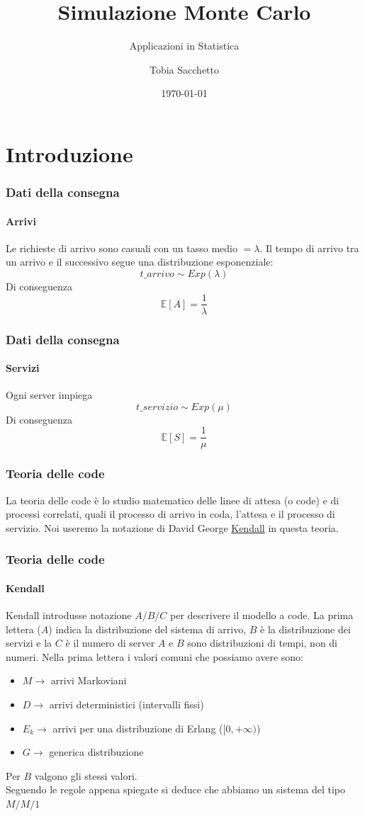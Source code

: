 \documentclass{beamer}
\title[Monte Carlo]{Simulazione Monte Carlo}
\subtitle{Applicazioni in Statistica}
\author{Tobia Sacchetto}
\institute{Università degli Studi di Ferrara}
\date{\today}
\begin{document}
\frame{\titlepage}

\section{Introduzione}

\begin{frame}
\frametitle{Dati della consegna}
\framesubtitle{Arrivi}
    Le richieste di arrivo sono casuali con un tasso medio $=\lambda$. Il tempo di arrivo tra un arrivo e il successivo segue una distribuzione esponenziale:
\[
t\_arrivo \sim Exp(\lambda)
\]
Di conseguenza
\[
\mathbb{E}[A]=\frac{1}{\lambda}
\]
\end{frame}

\begin{frame}
\frametitle{Dati della consegna}
\framesubtitle{Servizi}
   Ogni server impiega
\[
t\_servizio \sim Exp(\mu)
\]
Di conseguenza
\[
\mathbb{E}[S]=\frac{1}{\mu}
\]
\end{frame}

\begin{frame}
    \frametitle{Teoria delle code}

    La teoria delle code è lo studio matematico delle linee di attesa (o code) e di processi correlati, quali il processo di arrivo in coda, l'attesa  e il processo di servizio.
    Noi useremo la notazione di David George \underline{Kendall} in questa teoria.

\end{frame}

\begin{frame}
    \frametitle{Teoria delle code}
    \framesubtitle{Kendall}
    Kendall introdusse notazione $A/B/C$ per descrivere il modello a code.
    La prima lettera ($A$) indica la distribuzione del  sistema di arrivo, $B$ è la distribuzione dei servizi e la $C$ è il numero di server
    $A$ e $B$ sono distribuzioni di tempi, non di numeri.
    Nella prima lettera i valori comuni che possiamo avere sono: 
    \begin{itemize}
        \item $M\to$ arrivi Markoviani
        \item $D\to$ arrivi deterministici (intervalli fissi)
        \item $E_k\to$ arrivi per una distribuzione di Erlang ($[0,+\infty)$)
        \item $G\to$ generica distribuzione
    \end{itemize}
    Per $B$ valgono gli stessi valori.\\
    Seguendo le regole appena spiegate si deduce che abbiamo un sistema del tipo $M/M/1$
\end{frame}
\end{document}
